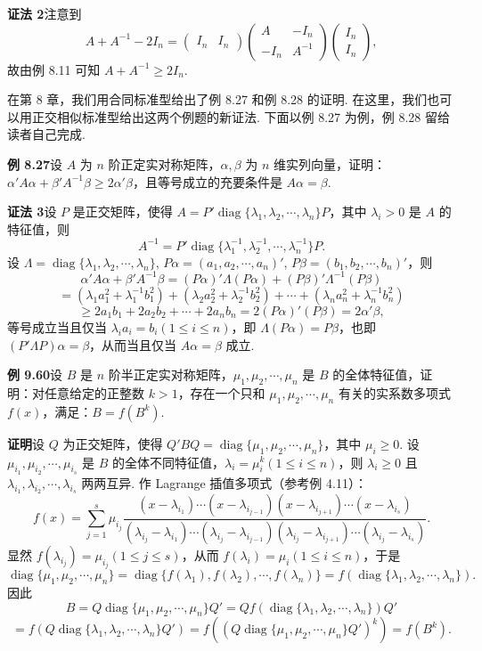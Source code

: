 \documentclass[UTF8, 12pt, fontset=fandol, oneside]{ctexart}
\begin{document}
\noindent\textbf{证法 2}\quad 注意到
\[
A+A^{-1}-2I_n=
\begin{pmatrix}
I_n&I_n
\end{pmatrix}
\begin{pmatrix}
A&-I_n\\
-I_n&A^{-1}
\end{pmatrix}
\begin{pmatrix}
I_n\\
I_n
\end{pmatrix},
\]
故由例 8.11 可知 $A+A^{-1}\ge2I_n$.

在第 8 章，我们用合同标准型给出了例 8.27 和例 8.28 的证明. 在这里，我们也可以用正交相似标准型给出这两个例题的新证法. 下面以例 8.27 为例，例 8.28 留给读者自己完成.

\noindent\textbf{例 8.27}\quad 设 $A$ 为 $n$ 阶正定实对称矩阵，$\alpha,\beta$ 为 $n$ 维实列向量，证明：$\alpha'A\alpha+\beta'A^{-1}\beta\ge2\alpha'\beta$，且等号成立的充要条件是 $A\alpha=\beta$.

\noindent\textbf{证法 3}\quad 设 $P$ 是正交矩阵，使得 $A=P'\operatorname{diag}\{\lambda_1,\lambda_2,\cdots,\lambda_n\}P$，其中 $\lambda_i>0$ 是 $A$ 的特征值，则
\[
A^{-1}=P'\operatorname{diag}\{\lambda_1^{-1},\lambda_2^{-1},\cdots,\lambda_n^{-1}\}P.
\]
设 $\Lambda=\operatorname{diag}\{\lambda_1,\lambda_2,\cdots,\lambda_n\}$, $P\alpha=(a_1,a_2,\cdots,a_n)'$, $P\beta=(b_1,b_2,\cdots,b_n)'$，则
\[
\alpha'A\alpha+\beta'A^{-1}\beta=(P\alpha)'\Lambda(P\alpha)+(P\beta)'\Lambda^{-1}(P\beta)
\]
\[
=(\lambda_1a_1^2+\lambda_1^{-1}b_1^2)+(\lambda_2a_2^2+\lambda_2^{-1}b_2^2)+\cdots+(\lambda_na_n^2+\lambda_n^{-1}b_n^2)
\]
\[
\ge2a_1b_1+2a_2b_2+\cdots+2a_nb_n=2(P\alpha)'(P\beta)=2\alpha'\beta,
\]
等号成立当且仅当 $\lambda_ia_i=b_i(1\le i\le n)$，即 $\Lambda(P\alpha)=P\beta$，也即 $(P'\Lambda P)\alpha=\beta$，从而当且仅当 $A\alpha=\beta$ 成立.

\noindent\textbf{例 9.60}\quad 设 $B$ 是 $n$ 阶半正定实对称矩阵，$\mu_1,\mu_2,\cdots,\mu_n$ 是 $B$ 的全体特征值，证明：对任意给定的正整数 $k>1$，存在一个只和 $\mu_1,\mu_2,\cdots,\mu_n$ 有关的实系数多项式 $f(x)$，满足：$B=f(B^k)$.

\noindent\textbf{证明}\quad 设 $Q$ 为正交矩阵，使得 $Q'BQ=\operatorname{diag}\{\mu_1,\mu_2,\cdots,\mu_n\}$，其中 $\mu_i\ge0$. 设 $\mu_{i_1},\mu_{i_2},\cdots,\mu_{i_s}$ 是 $B$ 的全体不同特征值，$\lambda_i=\mu_i^k(1\le i\le n)$，则 $\lambda_i\ge0$ 且 $\lambda_{i_1},\lambda_{i_2},\cdots,\lambda_{i_s}$ 两两互异. 作 Lagrange 插值多项式（参考例 4.11）：
\[
f(x)=\sum_{j=1}^s\mu_{i_j}
\frac{(x-\lambda_{i_1})\cdots(x-\lambda_{i_{j-1}})(x-\lambda_{i_{j+1}})\cdots(x-\lambda_{i_s})}
{(\lambda_{i_j}-\lambda_{i_1})\cdots(\lambda_{i_j}-\lambda_{i_{j-1}})(\lambda_{i_j}-\lambda_{i_{j+1}})\cdots(\lambda_{i_j}-\lambda_{i_s})}.
\]
显然 $f(\lambda_{i_j})=\mu_{i_j}(1\le j\le s)$，从而 $f(\lambda_i)=\mu_i(1\le i\le n)$，于是
\[
\operatorname{diag}\{\mu_1,\mu_2,\cdots,\mu_n\}
=\operatorname{diag}\{f(\lambda_1),f(\lambda_2),\cdots,f(\lambda_n)\}
=f(\operatorname{diag}\{\lambda_1,\lambda_2,\cdots,\lambda_n\}).
\]
因此
\[
B=Q\operatorname{diag}\{\mu_1,\mu_2,\cdots,\mu_n\}Q'
=Qf(\operatorname{diag}\{\lambda_1,\lambda_2,\cdots,\lambda_n\})Q'
\]
\[
=f(Q\operatorname{diag}\{\lambda_1,\lambda_2,\cdots,\lambda_n\}Q')
=f((Q\operatorname{diag}\{\mu_1,\mu_2,\cdots,\mu_n\}Q')^k)=f(B^k).
\]
\end{document}
